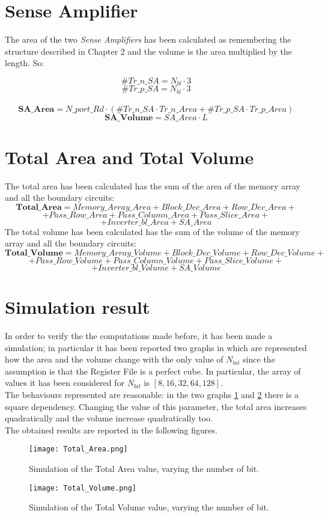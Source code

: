 \section{Sense Amplifier}
The area of the two \textit{Sense Amplifiers} has been calculated as remembering the structure described in Chapter 2 and the volume is the area multiplied by the length. So:

	\[
	\#Tr\_n\_SA=N_{bl} \cdot 3
	\]
	\[
	\#Tr\_p\_SA=N_{bl} \cdot 3
	\]
	\\
	\[
	\textbf{SA\_Area} = N\_port\_Rd \cdot (\#Tr\_n\_SA \cdot Tr\_n\_Area + \#Tr\_p\_SA \cdot Tr\_p\_Area)
	\]
	\[
	\textbf{SA\_Volume} = SA\_Area \cdot L
	\]

\section{Total Area and Total Volume}
The total area has been calculated has the sum of the area of the memory array and all the boundary circuits:
	\[
	\textbf{Total\_Area}= Memory\_Array\_Area + Block\_Dec\_Area + Row\_Dec\_Area + 
	\]
	\[
	+ Pass\_Row\_Area + Pass\_Column\_Area + Pass\_Slice\_Area +
	\]
	\[
	+ Inverter\_bl\_Area +  SA\_Area
	\]
The total volume has been calculated has the sum of the volume of the memory array and all the boundary circuits:
	\[
	\textbf{Total\_Volume}= Memory\_Array\_Volume + Block\_Dec\_Volume + Row\_Dec\_Volume + 
	\]
	\[
	+ Pass\_Row\_Volume + Pass\_Column\_Volume + Pass\_Slice\_Volume +
	\]
	\[
	+ Inverter\_bl\_Volume +  SA\_Volume
	\]
\section{Simulation result}
In order to verify the the computations made before, it has been made a simulation; in particular it has been reported two graphs in which are represented how the area and the volume change with the only value of $N_{bit}$ since the assumption is that the Register File is a perfect cube. In particular, the array of values it has been considered for $N_{bit}$ is $[8, 16, 32, 64, 128]$.
\\The behaviours represented are reasonable: in the two graphs \ref{fig:1} and \ref{fig:2} there is a square dependency. Changing the value of this parameter, the total area increases quadratically and the volume increase quadratically too.\\
The obtained results are reported in the following figures.

\begin{center}
	\begin{figure}[H]
		\centering
		\texttt{[image: Total\_Area.png]}
		\caption{Simulation of the Total Area value, varying the number of bit.} 
		\label{fig:1}
	\end{figure}
\end{center}

\begin{center}
	\begin{figure}[H]
		\centering
		\texttt{[image: Total\_Volume.png]}
		\caption{Simulation of the Total Volume value, varying the number of bit.}
		\label{fig:2} 
	\end{figure}
\end{center}

